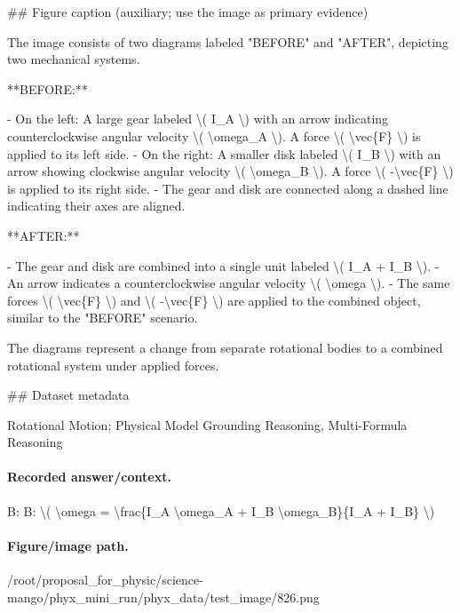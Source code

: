 \#\# Figure caption (auxiliary; use the image as primary evidence)

The image consists of two diagrams labeled "BEFORE" and "AFTER", depicting two mechanical systems.

**BEFORE:**

- On the left: A large gear labeled \textbackslash{}( I\_A \textbackslash{}) with an arrow indicating counterclockwise angular velocity \textbackslash{}( \textbackslash{}omega\_A \textbackslash{}). A force \textbackslash{}( \textbackslash{}vec\{F\} \textbackslash{}) is applied to its left side.
- On the right: A smaller disk labeled \textbackslash{}( I\_B \textbackslash{}) with an arrow showing clockwise angular velocity \textbackslash{}( \textbackslash{}omega\_B \textbackslash{}). A force \textbackslash{}( -\textbackslash{}vec\{F\} \textbackslash{}) is applied to its right side.
- The gear and disk are connected along a dashed line indicating their axes are aligned.

**AFTER:**

- The gear and disk are combined into a single unit labeled \textbackslash{}( I\_A + I\_B \textbackslash{}).
- An arrow indicates a counterclockwise angular velocity \textbackslash{}( \textbackslash{}omega \textbackslash{}).
- The same forces \textbackslash{}( \textbackslash{}vec\{F\} \textbackslash{}) and \textbackslash{}( -\textbackslash{}vec\{F\} \textbackslash{}) are applied to the combined object, similar to the "BEFORE" scenario.

The diagrams represent a change from separate rotational bodies to a combined rotational system under applied forces.

\#\# Dataset metadata

Rotational Motion; Physical Model Grounding Reasoning, Multi-Formula Reasoning

\paragraph{Recorded answer/context.}
B: B: \textbackslash{}( \textbackslash{}omega = \textbackslash{}frac\{I\_A \textbackslash{}omega\_A + I\_B \textbackslash{}omega\_B\}\{I\_A + I\_B\} \textbackslash{})

\paragraph{Figure/image path.}
/root/proposal\_for\_physic/science-mango/phyx\_mini\_run/phyx\_data/test\_image/826.png

